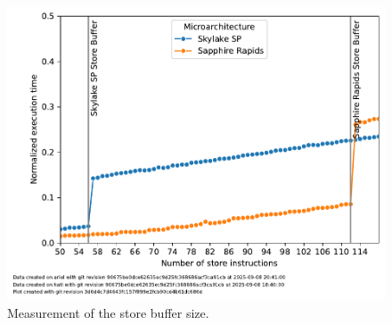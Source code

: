 \begin{figure}[]
    \centering
    \includegraphics[width=0.8\columnwidth]{fig/robsize/store-buffer.pdf}
    \caption{\label{fig:robsize-store}Measurement of the store buffer size.}
\end{figure}


